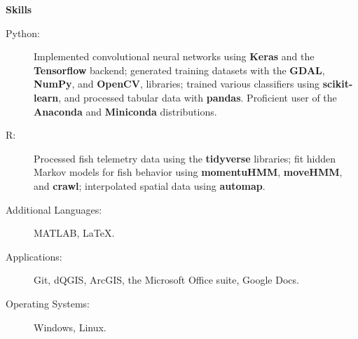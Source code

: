 \documentclass[letterpaper,11pt]{article}
\newcommand{\resheading}[1]{{\large \colorbox{mygrey}{\begin{minipage}{\textwidth}{\textbf{#1 \vphantom{p\^{E}}}}\end{minipage}}}}
\begin{document}
\resheading{Skills}
	\begin{description}
		\item[Python:] { \footnotesize Implemented convolutional neural networks using \textbf{Keras} and  the \textbf{Tensorflow} backend; generated training datasets with the \textbf{GDAL}, \textbf{NumPy}, and \textbf{OpenCV}, libraries; trained various classifiers using \textbf{scikit-learn}, and processed tabular data with \textbf{pandas}. Proficient user of the \textbf{Anaconda} and \textbf{Miniconda} distributions.}\\
		
		\item[R:] { \footnotesize Processed fish telemetry data using the \textbf{tidyverse} libraries; fit hidden Markov models for fish behavior using \textbf{momentuHMM}, \textbf{moveHMM}, and \textbf{crawl}; interpolated spatial data using \textbf{automap}.}
		
		\item[Additional Languages:] {\footnotesize MATLAB, \LaTeX.}
		
		\item[Applications:]{\footnotesize Git, dQGIS, ArcGIS, the Microsoft Office suite, Google Docs.}
		
		\item[Operating Systems:] {\footnotesize Windows, Linux}.
	\end{description}
\end{document}
